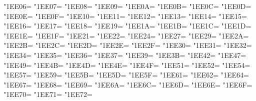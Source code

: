 \XeTeXcharclass"1EE06=\KclassArabU
\XeTeXcharclass"1EE07=\KclassArabU
\XeTeXcharclass"1EE08=\KclassArabU
\XeTeXcharclass"1EE09=\KclassArabU
\XeTeXcharclass"1EE0A=\KclassArabU
\XeTeXcharclass"1EE0B=\KclassArabU
\XeTeXcharclass"1EE0C=\KclassArabU
\XeTeXcharclass"1EE0D=\KclassArabU
\XeTeXcharclass"1EE0E=\KclassArabU
\XeTeXcharclass"1EE0F=\KclassArabU
\XeTeXcharclass"1EE10=\KclassArabU
\XeTeXcharclass"1EE11=\KclassArabU
\XeTeXcharclass"1EE12=\KclassArabU
\XeTeXcharclass"1EE13=\KclassArabU
\XeTeXcharclass"1EE14=\KclassArabU
\XeTeXcharclass"1EE15=\KclassArabU
\XeTeXcharclass"1EE16=\KclassArabU
\XeTeXcharclass"1EE17=\KclassArabU
\XeTeXcharclass"1EE18=\KclassArabU
\XeTeXcharclass"1EE19=\KclassArabU
\XeTeXcharclass"1EE1A=\KclassArabU
\XeTeXcharclass"1EE1B=\KclassArabU
\XeTeXcharclass"1EE1C=\KclassArabU
\XeTeXcharclass"1EE1D=\KclassArabU
\XeTeXcharclass"1EE1E=\KclassArabU
\XeTeXcharclass"1EE1F=\KclassArabU
\XeTeXcharclass"1EE21=\KclassArabU
\XeTeXcharclass"1EE22=\KclassArabU
\XeTeXcharclass"1EE24=\KclassArabU
\XeTeXcharclass"1EE27=\KclassArabU
\XeTeXcharclass"1EE29=\KclassArabU
\XeTeXcharclass"1EE2A=\KclassArabU
\XeTeXcharclass"1EE2B=\KclassArabU
\XeTeXcharclass"1EE2C=\KclassArabU
\XeTeXcharclass"1EE2D=\KclassArabU
\XeTeXcharclass"1EE2E=\KclassArabU
\XeTeXcharclass"1EE2F=\KclassArabU
\XeTeXcharclass"1EE30=\KclassArabU
\XeTeXcharclass"1EE31=\KclassArabU
\XeTeXcharclass"1EE32=\KclassArabU
\XeTeXcharclass"1EE34=\KclassArabU
\XeTeXcharclass"1EE35=\KclassArabU
\XeTeXcharclass"1EE36=\KclassArabU
\XeTeXcharclass"1EE37=\KclassArabU
\XeTeXcharclass"1EE39=\KclassArabU
\XeTeXcharclass"1EE3B=\KclassArabU
\XeTeXcharclass"1EE42=\KclassArabU
\XeTeXcharclass"1EE47=\KclassArabU
\XeTeXcharclass"1EE49=\KclassArabU
\XeTeXcharclass"1EE4B=\KclassArabU
\XeTeXcharclass"1EE4D=\KclassArabU
\XeTeXcharclass"1EE4E=\KclassArabU
\XeTeXcharclass"1EE4F=\KclassArabU
\XeTeXcharclass"1EE51=\KclassArabU
\XeTeXcharclass"1EE52=\KclassArabU
\XeTeXcharclass"1EE54=\KclassArabU
\XeTeXcharclass"1EE57=\KclassArabU
\XeTeXcharclass"1EE59=\KclassArabU
\XeTeXcharclass"1EE5B=\KclassArabU
\XeTeXcharclass"1EE5D=\KclassArabU
\XeTeXcharclass"1EE5F=\KclassArabU
\XeTeXcharclass"1EE61=\KclassArabU
\XeTeXcharclass"1EE62=\KclassArabU
\XeTeXcharclass"1EE64=\KclassArabU
\XeTeXcharclass"1EE67=\KclassArabU
\XeTeXcharclass"1EE68=\KclassArabU
\XeTeXcharclass"1EE69=\KclassArabU
\XeTeXcharclass"1EE6A=\KclassArabU
\XeTeXcharclass"1EE6C=\KclassArabU
\XeTeXcharclass"1EE6D=\KclassArabU
\XeTeXcharclass"1EE6E=\KclassArabU
\XeTeXcharclass"1EE6F=\KclassArabU
\XeTeXcharclass"1EE70=\KclassArabU
\XeTeXcharclass"1EE71=\KclassArabU
\XeTeXcharclass"1EE72=\KclassArabU
